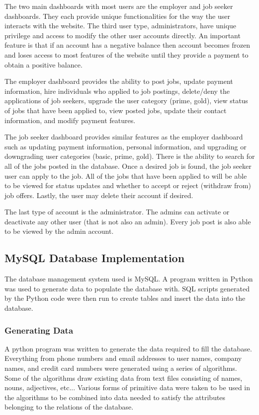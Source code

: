 \documentclass[11pt]{article}
\begin{document}
The two main dashboards with most users are the employer and job seeker dashboards. They each provide unique functionalities for the way the user interacts with the website. The third user type, administrators, have unique privilege and access to modify the other user accounts directly. An important feature is that if an account has a negative balance then account becomes frozen and loses access to most features of the website until they provide a payment to obtain a positive balance. \par
The employer dashboard provides the ability to post jobs, update payment information, hire individuals who applied to job postings, delete/deny the applications of job seekers, upgrade the user category (prime, gold), view status of jobs that have been applied to, view posted jobs, update their contact information, and modify payment features. \par 
The job seeker dashboard provides similar features as the employer dashboard such as updating payment information, personal information, and upgrading or downgrading user categories (basic, prime, gold). There is the ability to search for all of the jobs posted in the database. Once a desired job is found, the job seeker user can apply to the job. All of the jobs that have been applied to will be able to be viewed for status updates and whether to accept or reject (withdraw from) job offers. Lastly, the user may delete their account if desired. \par
The last type of account is the administrator. The admins can activate or deactivate any other user (that is not also an admin).  Every job post is also able to be viewed by the admin account.

\subsection{MySQL Database Implementation}

The database management system used is MySQL. A program written in Python was used to generate data to populate the database with. SQL scripts generated by the Python code were then run to create tables and insert the data into the database.

\subsubsection{Generating Data}

A python program was written to generate the data required to fill the database. Everything from phone numbers and email addresses to user names, company names, and credit card numbers were generated using a series of algorithms. Some of the algorithms draw existing data from text files consisting of names, nouns, adjectives, etc... Various forms of primitive data were taken to be used in the algorithms to be combined into data needed to satisfy the attributes belonging to the relations of the database.
\end{document}
